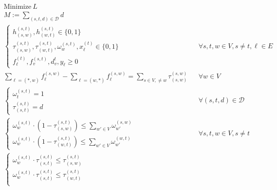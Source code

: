 \documentclass[a4paper,USenglish]{lipics-v2018}
\begin{document}
\begin{align}
& \text{Minimize} ~L \nonumber	&&\\
&M := \sum_{ (s,t,d) \in \mathcal{D}} d &&\\
&\begin{cases}
	h^{(s,t)}_{(s,w)}, h^{(s,t)}_{(w,t)}  \in \{0,1\} \\
	\tau^{(s,t)}_{(s,w)}, \tau^{(s,t)}_{(w,t)},
	\omega^{(s,t)}_{w},
	x^{(t)}_{\ell} 
 \in \{0,1\} \\
 f^{(t)}_{\ell}, f^{(s,t)}_{v}, d^{t}_v, y_{\ell}  \geq 0
\end{cases}
&&\forall  s,t,w \in V, s \neq t, \ell \in E \label{LP:vardef}    
\\
&\sum_{\ell = (*,w)} f^{(s,w)}_{\ell} - \sum_{\ell= (w,*)}f^{(s,w)}_{\ell}
	= \sum_{ s\in V,\neq w} \tau^{(s,w)}_{(s,w)}
&& \forall w \in V
  \label{LP:flowdest}
 \\
 & 
 \begin{cases}
	 \omega^{(s,t)}_{t} = 1 \\
	 \tau^{(s,t)}_{(s,t)} = d
 \end{cases}
 && \forall (s,t,d) \in \mathcal{D}
 \label{LP:wp_t}
 \\
 &
 \begin{cases*}
    \omega^{(s,t)}_{w} \cdot (1-\tau^{(s,t)}_{(s,w)}) \leq  \sum_{w' \in V} \omega^{(s,w)}_{w'}	\\
    \omega^{(s,t)}_{w} \cdot (1-\tau^{(s,t)}_{(w,t)})  \leq  \sum_{w' \in V} \omega^{(w,t)}_{w'}	    
 \end{cases*}	 
 && \forall s,t,w \in V, s\neq t
 \label{LP:segments}
  \\
 &
 \begin{cases*}
  \omega^{(s,t)}_{w} \cdot \tau^{(s,t)}_{(s,t)} \leq \tau^{(s,t)}_{(s,w)}	\\
 \omega^{(s,t)}_{w}  \cdot \tau^{(s,t)}_{(s,t)} \leq  \tau^{(s,t)}_{(w,t)}\\

\end{cases*}
\end{align}
\end{document}
